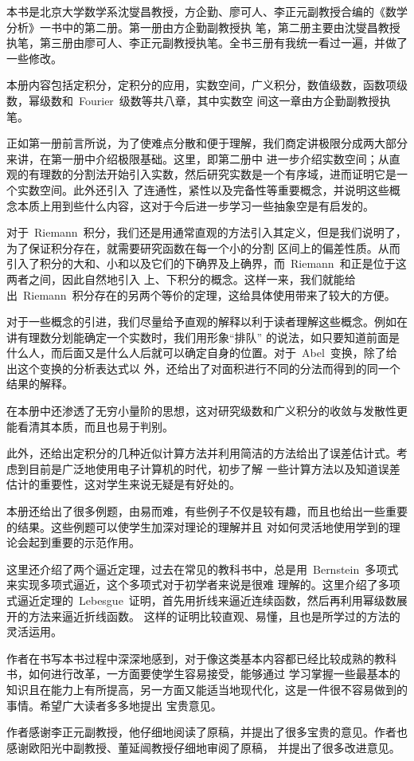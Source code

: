 
\begin{preface}
本书是北京大学数学系沈燮昌教授，方企勤、廖可人、李正元副教授合编的《数学分析》一书中的第二册。第一册由方企勤副教授执
笔，第二册主要由沈燮昌教授执笔，第三册由廖可人、李正元副教授执笔。全书三册有我统一看过一遍，并做了一些修改。

本册内容包括定积分，定积分的应用，实数空间，广义积分，数值级数，函数项级数，幂级数和~Fourier~级数等共八章，其中实数空
间这一章由方企勤副教授执笔。

正如第一册前言所说，为了使难点分散和便于理解，我们商定讲极限分成两大部分来讲，在第一册中介绍极限基础。这里，即第二册中
进一步介绍实数空间；从直观的有理数的分割法开始引入实数，然后研究实数是一个有序域，进而证明它是一个实数空间。此外还引入
了连通性，紧性以及完备性等重要概念，并说明这些概念本质上用到些什么内容，这对于今后进一步学习一些抽象空是有启发的。

对于~Riemann~积分，我们还是用通常直观的方法引入其定义，但是我们说明了，为了保证积分存在，就需要研究函数在每一个小的分割
区间上的偏差性质。从而引入了积分的大和、小和以及它们的下确界及上确界，而~Riemann~和正是位于这两者之间，因此自然地引入
上、下积分的概念。这样一来，我们就能给出~Riemann~积分存在的另两个等价的定理，这给具体使用带来了较大的方便。

对于一些概念的引进，我们尽量给予直观的解释以利于读者理解这些概念。例如在讲有理数分划能确定一个实数时，我们用形象“排队”
的说法，如只要知道前面是什么人，而后面又是什么人后就可以确定自身的位置。对于~Abel~变换，除了给出这个变换的分析表达式以
外，还给出了对面积进行不同的分法而得到的同一个结果的解释。

在本册中还渗透了无穷小量阶的思想，这对研究级数和广义积分的收敛与发散性更能看清其本质，而且也易于判别。

此外，还给出定积分的几种近似计算方法并利用简洁的方法给出了误差估计式。考虑到目前是广泛地使用电子计算机的时代，初步了解
一些计算方法以及知道误差估计的重要性，这对学生来说无疑是有好处的。

本册还给出了很多例题，由易而难，有些例子不仅是较有趣，而且也给出一些重要的结果。这些例题可以使学生加深对理论的理解并且
对如何灵活地使用学到的理论会起到重要的示范作用。

这里还介绍了两个逼近定理，过去在常见的教科书中，总是用~Bernstein~多项式来实现多项式逼近，这个多项式对于初学者来说是很难
理解的。这里介绍了多项式逼近定理的~Lebesgue~证明，首先用折线来逼近连续函数，然后再利用幂级数展开的方法来逼近折线函数。%
这样的证明比较直观、易懂，且也是所学过的方法的灵活运用。

作者在书写本书过程中深深地感到，对于像这类基本内容都已经比较成熟的教科书，如何进行改革，一方面要使学生容易接受，能够通过
学习掌握一些最基本的知识且在能力上有所提高，另一方面又能适当地现代化，这是一件很不容易做到的事情。希望广大读者多多地提出
宝贵意见。

作者感谢李正元副教授，他仔细地阅读了原稿，并提出了很多宝贵的意见。作者也感谢欧阳光中副教授、董延闿教授仔细地审阅了原稿，%
并提出了很多改进意见。
\end{preface}

\endinput
